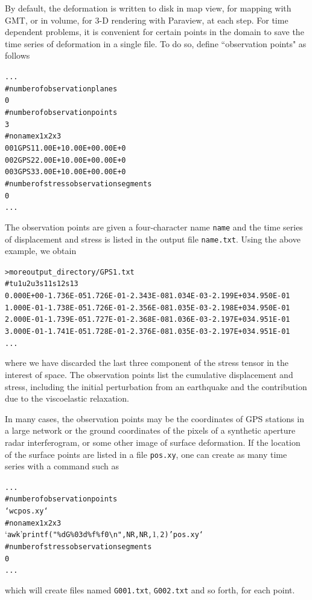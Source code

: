\documentclass[10pt]{article}
\begin{document}
By default, the deformation is written to disk in map view, for mapping with GMT, or in volume, for 3-D rendering with Paraview, at each step. For time dependent problems, it is convenient for certain points in the domain to save the time series of deformation in a single file. To do so, define ``observation points" as follows
\begin{alltt}
...
# number of observation planes
0
# number of observation points
{\color{NavyBlue}3}
# no name       x1       x2       x3
{\color{NavyBlue} 001 GPS1  1.00E+1  0.00E+0  0.00E+0
 002 GPS2  2.00E+1  0.00E+0  0.00E+0
 003 GPS3  3.00E+1  0.00E+0  0.00E+0}
# number of stress observation segments
0
...
\end{alltt}
The observation points are given a four-character name \verb'name' and the time series of displacement and stress is listed in the output file \verb'name.txt'. Using the above example, we obtain
\begin{alltt}
> more output_directory/GPS1.txt
#         t         u1        u2         u3       s11        s12       s13
  0.000E+00 -1.736E-05 1.726E-01 -2.343E-08 1.034E-03 -2.199E+03 4.950E-01
  1.000E-01 -1.738E-05 1.726E-01 -2.356E-08 1.035E-03 -2.198E+03 4.950E-01
  2.000E-01 -1.739E-05 1.727E-01 -2.368E-08 1.036E-03 -2.197E+03 4.951E-01
  3.000E-01 -1.741E-05 1.728E-01 -2.376E-08 1.035E-03 -2.197E+03 4.951E-01
...
\end{alltt}
where we have discarded the last three component of the stress tensor in the interest of space. The observation points list the cumulative displacement and stress, including the initial perturbation from an earthquake and the contribution due to the viscoelastic relaxation.


In many cases, the observation points may be the coordinates of GPS stations in a large network or the ground coordinates of the pixels of a synthetic aperture radar interferogram, or some other image of surface deformation. If the location of the surface points are listed in a file \verb'pos.xy', one can create as many time series with a command such as
\begin{alltt}
...
# number of observation points
{\color{NavyBlue}`wc pos.xy`}
# no name       x1       x2       x3
{\color{NavyBlue}`awk '{\textbraceleft}printf("\%d G\%03d \%f \%f 0{\textbackslash}n",NR,NR,$1,$2){\textbraceright}' pos.xy`}
# number of stress observation segments
0
...
\end{alltt}
which will create files named \verb'G001.txt', \verb'G002.txt' and so forth, for each point.
\end{document}
